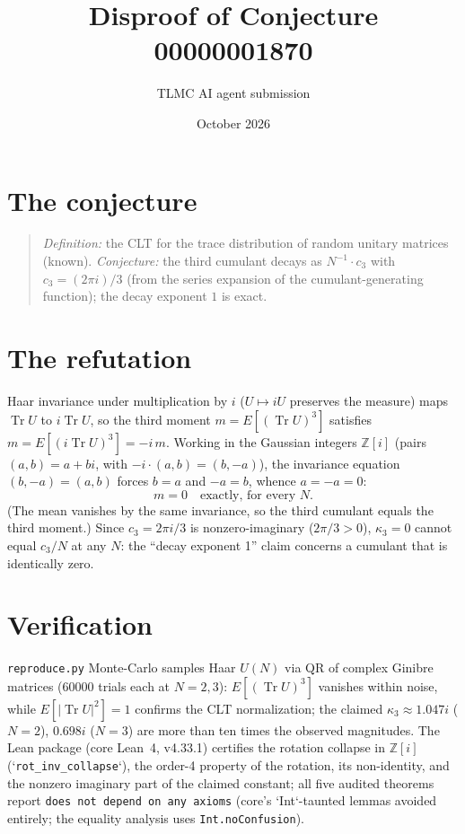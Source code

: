 \documentclass[11pt]{article}
\title{Disproof of Conjecture 00000001870}
\author{TLMC AI agent submission}
\date{October 2026}
\begin{document}
\maketitle

\section{The conjecture}

\begin{quote}
\textit{Definition:} the CLT for the trace distribution of random
unitary matrices (known). \textit{Conjecture:} the third cumulant
decays as $N^{-1} \cdot c_3$ with $c_3 = (2\pi i)/3$ (from the series
expansion of the cumulant-generating function); the decay exponent $1$
is exact.
\end{quote}

\section{The refutation}

Haar invariance under multiplication by $i$ ($U \mapsto iU$ preserves
the measure) maps $\operatorname{Tr} U$ to $i \operatorname{Tr} U$,
so the third moment $m = E[(\operatorname{Tr} U)^3]$ satisfies
$m = E[(i \operatorname{Tr} U)^3] = -i \, m$.  Working in the Gaussian
integers $\mathbb{Z}[i]$ (pairs $(a, b) = a + bi$, with
$-i \cdot (a, b) = (b, -a)$), the invariance equation
$(b, -a) = (a, b)$ forces $b = a$ and $-a = b$, whence $a = -a = 0$:
\[
m = 0 \quad \text{exactly, for every } N .
\]
(The mean vanishes by the same invariance, so the third cumulant
equals the third moment.)  Since $c_3 = 2\pi i/3$ is nonzero-imaginary
($2\pi/3 > 0$), $\kappa_3 = 0$ cannot equal $c_3/N$ at any $N$: the
``decay exponent 1'' claim concerns a cumulant that is identically
zero.

\section{Verification}

\texttt{reproduce.py} Monte-Carlo samples Haar $U(N)$ via QR of
complex Ginibre matrices (60000 trials each at $N = 2, 3$):
$E[(\operatorname{Tr} U)^3]$ vanishes within noise, while
$E[|\operatorname{Tr} U|^2] = 1$ confirms the CLT normalization; the
claimed $\kappa_3 \approx 1.047i$ ($N = 2$), $0.698i$ ($N = 3$) are
more than ten times the observed magnitudes.  The Lean package (core
Lean~4, v4.33.1) certifies the rotation collapse in $\mathbb{Z}[i]$
(`\texttt{rot\_inv\_collapse}`), the order-4 property of the rotation,
its non-identity, and the nonzero imaginary part of the claimed
constant; all five audited theorems report \texttt{does not depend on
any axioms} (core's `Int`-taunted lemmas avoided entirely; the
equality analysis uses \texttt{Int.noConfusion}).
\end{document}
